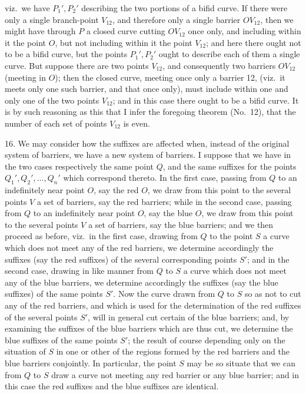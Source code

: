 \documentclass[11pt,a4paper]{article}
\begin{document}
\noindent viz.\ we have $P_{1}', P_{2}'$ describing the two portions of a bifid curve. If there were only a single branch-point $V_{12}$, and therefore only a single barrier $OV_{12}$, then we might have through $P$ a closed curve cutting $OV_{12}$ once only, and including within it the point $O$, but not including within it the point $V_{12}$; and here there ought not to be a bifid curve, but the points $P_{1}', P_{2}'$ ought to describe each of them a single curve. But suppose there are two points $V_{12}$, and consequently two barriers $OV_{12}$ (meeting in $O$); then the closed curve, meeting once only a barrier 12, (viz.\ it meets only one such barrier, and that once only), must include within one and only one of the two points $V_{12}$; and in this case there ought to be a bifid curve. It is by such reasoning as this that I infer the foregoing theorem (No.~12), that the number of each set of points $V_{12}$ is even.

\medskip

16. We may consider how the suffixes are affected when, instead of the original system of barriers, we have a new system of barriers. I suppose that we have in the two cases respectively the same point $Q$, and the same suffixes for the points $Q_{1}', Q_{2}', \ldots, Q_{n}'$ which correspond thereto. In the first case, passing from $Q$ to an indefinitely near point $O$, say the red $O$, we draw from this point to the several points $V$ a set of barriers, say the red barriers; while in the second case, passing from $Q$ to an indefinitely near point $O$, say the blue $O$, we draw from this point to the several points $V$ a set of barriers, say the blue barriers; and we then proceed as before, viz.\ in the first case, drawing from $Q$ to the point $S$ a curve which does not meet any of the red barriers, we determine accordingly the suffixes (say the red suffixes) of the several corresponding points $S'$; and in the second case, drawing in like manner from $Q$ to $S$ a curve which does not meet any of the blue barriers, we determine accordingly the suffixes (say the blue suffixes) of the same points $S'$. Now the curve drawn from $Q$ to $S$ so as not to cut any of the red barriers, and which is used for the determination of the red suffixes of the several points $S'$, will in general cut certain of the blue barriers; and, by examining the suffixes of the blue barriers which are thus cut, we determine the blue suffixes of the same points $S'$; the result of course depending only on the situation of $S$ in one or other of the regions formed by the red barriers and the blue barriers conjointly. In particular, the point $S$ may be so situate that we can from $Q$ to $S$ draw a curve not meeting any red barrier or any blue barrier; and in this case the red suffixes and the blue suffixes are identical.
\end{document}
